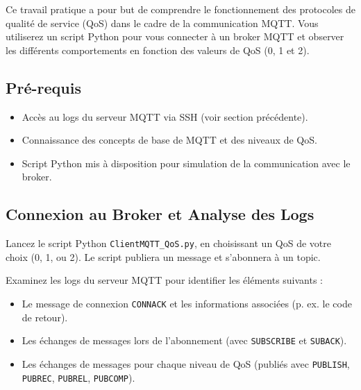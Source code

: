\documentclass{article}
\begin{document}
Ce travail pratique a pour but de comprendre le fonctionnement des protocoles de qualité de service (QoS) dans le cadre de la communication MQTT. Vous utiliserez un script Python pour vous connecter à un broker MQTT et observer les différents comportements en fonction des valeurs de QoS (0, 1 et 2). 

\subsection{Pré-requis}

\begin{itemize}
    \item Accès au logs du serveur MQTT via SSH (voir section précédente).
    \item Connaissance des concepts de base de MQTT et des niveaux de QoS.
    \item Script Python mis à disposition pour simulation de la communication avec le broker.
\end{itemize}

\subsection{Connexion au Broker et Analyse des Logs}

Lancez le script Python \texttt{ClientMQTT\_QoS.py}, en choisissant un QoS de votre choix (0, 1, ou 2). Le script publiera un message et s'abonnera à un topic. 

Examinez les logs du serveur MQTT pour identifier les éléments suivants :

\begin{itemize}
    \item Le message de connexion \texttt{CONNACK} et les informations associées (p. ex. le code de retour).
    \item Les échanges de messages lors de l'abonnement (avec \texttt{SUBSCRIBE} et \texttt{SUBACK}).
    \item Les échanges de messages pour chaque niveau de QoS (publiés avec \texttt{PUBLISH}, \texttt{PUBREC}, \texttt{PUBREL}, \texttt{PUBCOMP}).
\end{itemize}
\end{document}
